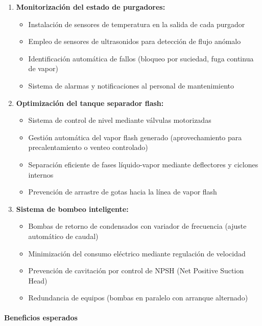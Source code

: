 \begin{enumerate}[label=\arabic*., leftmargin=2em]
	\item \textbf{Monitorización del estado de purgadores:}
	      \begin{itemize}[noitemsep]
		      \item Instalación de sensores de temperatura en la salida de cada purgador
		      \item Empleo de sensores de ultrasonidos para detección de flujo anómalo
		      \item Identificación automática de fallos (bloqueo por suciedad, fuga continua de vapor)
		      \item Sistema de alarmas y notificaciones al personal de mantenimiento
	      \end{itemize}

	\item \textbf{Optimización del tanque separador flash:}
	      \begin{itemize}[noitemsep]
		      \item Sistema de control de nivel mediante válvulas motorizadas
		      \item Gestión automática del vapor flash generado (aprovechamiento para precalentamiento o venteo controlado)
		      \item Separación eficiente de fases líquido-vapor mediante deflectores y ciclones internos
		      \item Prevención de arrastre de gotas hacia la línea de vapor flash
	      \end{itemize}

	\item \textbf{Sistema de bombeo inteligente:}
	      \begin{itemize}[noitemsep]
		      \item Bombas de retorno de condensados con variador de frecuencia (ajuste automático de caudal)
		      \item Minimización del consumo eléctrico mediante regulación de velocidad
		      \item Prevención de cavitación por control de NPSH (Net Positive Suction Head)
		      \item Redundancia de equipos (bombas en paralelo con arranque alternado)
	      \end{itemize}
\end{enumerate}

\paragraph{Beneficios esperados}

